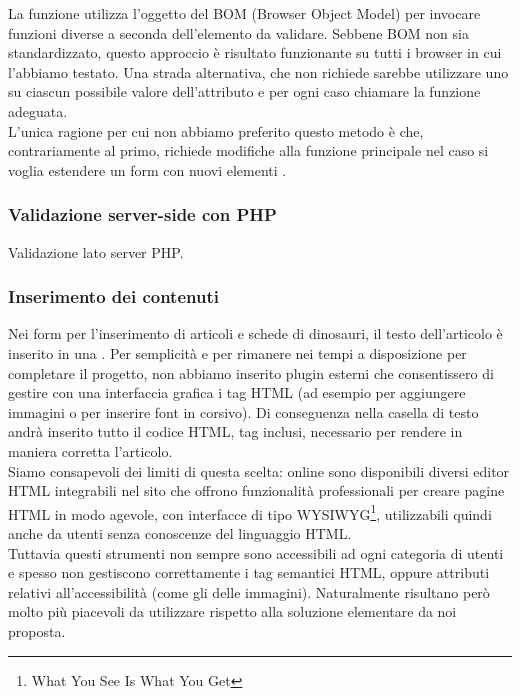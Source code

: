 \documentclass[12pt]{article}
\begin{document}
	La funzione  utilizza l'oggetto  del BOM (Browser Object Model) per invocare funzioni diverse a seconda dell'elemento da validare. Sebbene BOM non sia standardizzato, questo approccio è risultato funzionante su tutti i browser in cui l'abbiamo testato. Una strada alternativa, che non richiede  sarebbe utilizzare uno  su ciascun possibile valore dell'attributo  e per ogni caso chiamare la funzione adeguata.\\ L'unica ragione per cui non abbiamo preferito questo metodo è che, contrariamente al primo, richiede modifiche alla funzione principale  nel caso si voglia estendere un form con nuovi elementi . 
	
	\subsubsection*{Validazione server-side con PHP}
	Validazione lato server PHP. 
	
	\subsubsection{Inserimento dei contenuti} \label{sssec:inserimentocontenuti}
	Nei form per l'inserimento di articoli e schede di dinosauri, il testo dell'articolo è inserito in una . Per semplicità e per rimanere nei tempi a disposizione per completare il progetto, non abbiamo inserito plugin esterni che consentissero di gestire con una interfaccia grafica i tag HTML (ad esempio per aggiungere immagini o per inserire font in corsivo). Di conseguenza nella casella di testo andrà inserito tutto il codice HTML, tag inclusi, necessario per rendere in maniera corretta l'articolo. \\
	Siamo consapevoli dei limiti di questa scelta: online sono disponibili diversi editor HTML integrabili nel sito che offrono funzionalità professionali per creare pagine HTML in modo agevole, con interfacce di tipo WYSIWYG\footnote{What You See Is What You Get}, utilizzabili quindi anche da utenti senza conoscenze del linguaggio HTML.\\
	Tuttavia questi strumenti non sempre sono accessibili ad ogni categoria di utenti e spesso non gestiscono correttamente i tag semantici HTML, oppure attributi relativi all'accessibilità (come gli  delle immagini). Naturalmente risultano però molto più piacevoli da utilizzare rispetto alla soluzione elementare da noi proposta.
	
\end{document}
